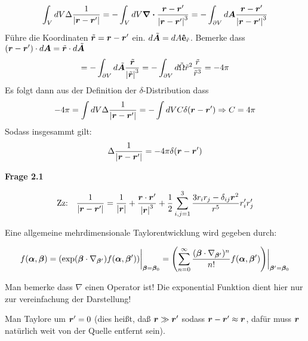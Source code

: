     \begin{equation*}
      \int_V dV \Delta \frac{1}{\abs{\vb*{r}-\vb*{r}'}} 
      = -\int_V dV \div \frac{\vb* r - \vb* r'}{\abs{\vb* r - \vb* r'}^3} 
      = -\int_{\partial V} 
      d\vb* A \frac{\vb* r - \vb* r'}{\abs{\vb* r - \vb* r'}^3}
    \end{equation*}
    Führe die Koordinaten $\tilde {\vb* {r}} = \vb* r-\vb* r'$ ein.
    $d\tilde {\vb* A} =dA \vu { e}_{\tilde r}$. Bemerke dass 
    $(\vb* r-\vb*r')\cdot d\vb* A= \tilde{\vb* r}\cdot d\tilde{\vb* A}$
    \begin{equation*}
      = -\int_{\partial V} 
      d\tilde{\vb*{A}} \frac{\tilde{\vb* {r}}}{\abs{\tilde{\vb*{r}}}^3}
      = -\int_{\partial V} 
      d\tilde \Omega \tilde r^2 \frac{\tilde r}{\tilde r^3} = -4\pi
    \end{equation*}
    Es folgt dann aus der Definition der $\delta$-Distribution dass
    \begin{equation*}
      -4\pi = \int dV \Delta \frac{1}{\abs{\vb*{r}-\vb*{r}'}} = -\int dV C\delta(\vb* r - \vb* r')
      \Rightarrow C=4\pi
    \end{equation*}
    Sodass insgesammt gilt:
    \begin{equation*}
      \Delta \frac{1}{\abs{\vb*{r}-\vb*{r}'}} = -4\pi \delta (\vb* r - \vb* r')
    \end{equation*}

  \newpage
  \textbf{Frage 2.1} 
   
    \begin{equation*}
      \text{Zz:}\quad
      \frac{1}{\abs{\vb*{r}-\vb*{r}'}}= \frac{1}{\abs{\vb*r}}
      +\frac{\vb*r\cdot\vb*r'}{\abs{\vb*r}^3} 
      +\frac{1}{2}\sum_{i,j=1}^3 \frac{3r_ir_j-\delta_{ij}\vb*r^2}{r^5}
      r_i'r_j'
    \end{equation*}

    Eine allgemeine mehrdimensionale Taylorentwicklung wird gegeben durch:

    \begin{equation*}
      f(\vb*\alpha, \vb*\beta)
      =\qty(\exp(\vb*\beta\cdot\nabla_{\vb*\beta'})
      f(\vb*\alpha, \vb*\beta'))
      \bigg|_{\vb*\beta=\vb*\beta_0}
      =\qty(\sum_{n=0}^\infty
      \frac{(\vb*\beta\cdot\nabla_{\vb*\beta'})^n}{n!}
      f(\vb*\alpha, \vb*\beta'))
      \bigg|_{\vb*\beta'=\vb*\beta_0}
    \end{equation*}

    Man bemerke dass $\nabla$ einen Operator ist! Die exponential Funktion
    dient hier nur zur vereinfachung der Darstellung!

    Man Taylore um $\vb*r'=0$ (dies heißt, daß $\vb*r\gg\vb*r'$ sodass 
    $\vb*r-\vb*r'\approx\vb*r$, dafür muss $\vb*r$ natürlich weit
    von der Quelle entfernt sein).

